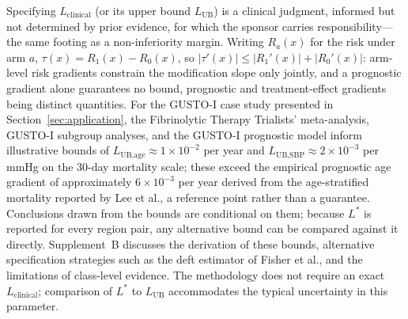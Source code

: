 \documentclass[AMA,Times1COL]{WileyNJDv5}
\begin{document}
Specifying $L_{\text{clinical}}$ (or its upper bound $L_{\text{UB}}$) is a clinical judgment, informed but not determined by prior evidence, for which the sponsor carries responsibility---the same footing as a non-inferiority margin. Writing $R_a(x)$ for the risk under arm $a$, $\tau(x) = R_1(x) - R_0(x)$, so $|\tau'(x)| \leq |R_1'(x)| + |R_0'(x)|$: arm-level risk gradients constrain the modification slope only jointly, and a prognostic gradient alone guarantees no bound, prognostic and treatment-effect gradients being distinct quantities.\cite{ballman2015,kent2020} For the GUSTO-I case study presented in Section~\ref{sec:application}, the Fibrinolytic Therapy Trialists' meta-analysis\cite{ftt1994}, GUSTO-I subgroup analyses,\cite{gusto1993} and the GUSTO-I prognostic model\cite{lee1995} inform illustrative bounds of $L_{\text{UB,age}} \approx 1 \times 10^{-2}$ per year and $L_{\text{UB,SBP}} \approx 2 \times 10^{-3}$ per mmHg on the 30-day mortality scale; these exceed the empirical prognostic age gradient of approximately $6 \times 10^{-3}$ per year derived from the age-stratified mortality reported by Lee et al.,\cite{lee1995} a reference point rather than a guarantee. Conclusions drawn from the bounds are conditional on them; because $L^*$ is reported for every region pair, any alternative bound can be compared against it directly. Supplement~B discusses the derivation of these bounds, alternative specification strategies such as the deft estimator of Fisher et al.,\cite{fisher2017} and the limitations of class-level evidence. The methodology does not require an exact $L_{\text{clinical}}$; comparison of $L^*$ to $L_{\text{UB}}$ accommodates the typical uncertainty in this parameter.
\end{document}
